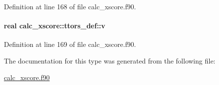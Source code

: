 Definition at line 168 of file calc\-\_\-xscore.\-f90.

\hypertarget{structcalc__xscore_1_1ttors__def_ad1993036f8e7af1389fa1b2e84b133b3}{
\paragraph[{v}]{\setlength{\rightskip}{0pt plus 5cm}real calc\-\_\-xscore\-::ttors\-\_\-def\-::v}}\label{structcalc__xscore_1_1ttors__def_ad1993036f8e7af1389fa1b2e84b133b3}


Definition at line 169 of file calc\-\_\-xscore.\-f90.



The documentation for this type was generated from the following file\-:\begin{DoxyCompactItemize}
\item 
\hyperlink{calc__xscore_8f90}{calc\-\_\-xscore.\-f90}\end{DoxyCompactItemize}
